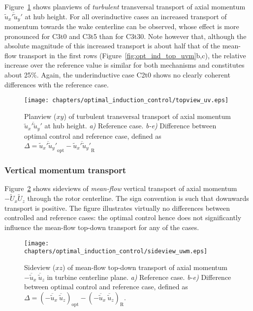 		Figure~\ref{fig:opt_ind_top_uv} shows planviews of \emph{turbulent} transversal transport of axial momentum $\overline{\widetilde{u}_x' \widetilde{u}_y'}$ at hub height. For all overinductive cases an increased transport of momentum towards the wake centerline can be observed, whose effect is more pronounced for C3t0 and C3t5 than for C3t30. Note however that, although the absolute magnitude of this increased transport is about half that of the mean-flow transport in the first rows (Figure~\ref{fig:opt_ind_top_uvm}b,c), the relative increase over the reference value is similar for both mechanisms and constitutes about 25\%. Again, the underinductive case C2t0 shows no clearly coherent differences with the reference case. 
	
		\begin{figure}[hbt]
			\centering
			\texttt{[image: chapters/optimal\_induction\_control/topview\_uv.eps]}
			\caption[Planview ($xy$) of turbulent transversal transport of axial momentum $\overline{\widetilde{u}_x' \widetilde{u}_y'}$ at hub height.]{Planview ($xy$) of turbulent transversal transport of axial momentum $\overline{\widetilde{u}_x' \widetilde{u}_y'}$ at hub height. \emph{a) } Reference case. \emph{b-e)} Difference between optimal control and reference case, defined as $\Delta = \overline{\widetilde{u}_x' \widetilde{u}_y'}_{\text{opt}} - \overline{\widetilde{u}_x' \widetilde{u}_y'}_{\text{R}}$  \label{fig:opt_ind_top_uv}}
		\end{figure}	
	
		\clearpage
	
	
	\subsubsection{Vertical momentum transport}

	Figure~\ref{fig:opt_ind_side_uwm} shows sideviews of \emph{mean-flow} vertical transport of axial momentum $- \widetilde{U}_x \widetilde{U}_z$ through the rotor centerline. The sign convention is such that downwards transport is positive. The figure illustrates virtually no differences between controlled and reference cases: the optimal control hence does not significantly influence the mean-flow top-down transport for any of the cases.

	\begin{figure}[t]
		\centering
		\texttt{[image: chapters/optimal\_induction\_control/sideview\_uwm.eps]}
		\caption[Sideview ($xz$) of mean-flow top-down transport of axial momentum $- \overline{\widetilde{u}}_x~ \overline{\widetilde{u}}_z$ in turbine centerline plane.]{Sideview ($xz$) of mean-flow top-down transport of axial momentum $- \overline{\widetilde{u}}_x~ \overline{\widetilde{u}}_z$ in turbine centerline plane. \emph{a) } Reference case. \emph{b-e)} Difference between optimal control and reference case, defined as $\Delta = (- \overline{\widetilde{u}}_x~ \overline{\widetilde{u}}_z)_{\text{opt}} - (- \overline{\widetilde{u}}_x~ \overline{\widetilde{u}}_z)_{\text{R}}$. \label{fig:opt_ind_side_uwm}}
	\end{figure}

